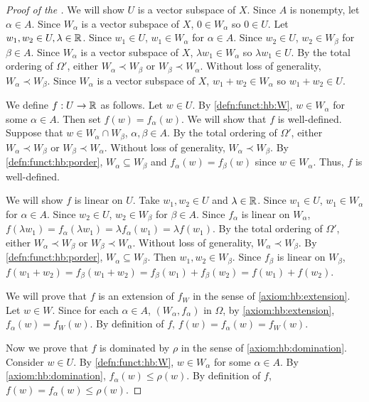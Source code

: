 \begin{proof}[Proof of the ]
We will show $U$ is a vector subspace of $X$. Since $A$ is nonempty, let $\alpha \in A$. Since $W_\alpha$ is a vector subspace of $X$, $0 \in W_\alpha$ so $0 \in U$. Let $w_1, w_2 \in U, \lambda \in {\mathbb R}$.
Since $w_1 \in U$, $w_1 \in W_\alpha$ for $\alpha \in A$.
Since $w_2 \in U$, $w_2 \in W_\beta$ for $\beta \in A$.
Since $W_\alpha$ is a vector subspace of $X$, $\lambda w_1 \in W_\alpha$ so $\lambda w_1 \in U$.
By the total ordering of $\Omega'$, either $W_\alpha \prec W_\beta$ or $W_\beta \prec W_\alpha$.
Without loss of generality, $W_\alpha \prec W_\beta$. Since $W_\alpha$ is a vector subspace of $X$, $w_1 + w_2 \in W_\alpha$ so $w_1 + w_2 \in U$.

We define $f : U \to {\mathbb R}$ as follows. Let $w \in U$. By \ref{defn:funct:hb:W}, $w \in W_\alpha$ for some $\alpha \in A$. Then set $f(w) = f_\alpha(w)$. We will show that $f$ is well-defined. Suppose that $w \in W_\alpha \cap W_\beta$, $\alpha, \beta \in A$. By the total ordering of $\Omega'$, either $W_\alpha \prec W_\beta$ or $W_\beta \prec W_\alpha$. Without loss of generality, $W_\alpha \prec W_\beta$. By \ref{defn:funct:hb:porder}, $W_\alpha \subseteq W_\beta$ and $f_\alpha(w) = f_\beta(w)$ since $w \in W_\alpha$. Thus, $f$ is well-defined.

We will show $f$ is linear on $U$. Take $w_1, w_2 \in U$ and $\lambda \in {\mathbb R}$.
Since $w_1 \in U$, $w_1 \in W_\alpha$ for $\alpha \in A$.
Since $w_2 \in U$, $w_2 \in W_\beta$ for $\beta \in A$.
Since $f_\alpha$ is linear on $W_\alpha$, $f(\lambda w_1) = f_\alpha(\lambda w_1) = \lambda f_\alpha(w_1) = \lambda f(w_1)$. By the total ordering of $\Omega'$, either $W_\alpha \prec W_\beta$ or $W_\beta \prec W_\alpha$. Without loss of generality, $W_\alpha \prec W_\beta$. By \ref{defn:funct:hb:porder}, $W_\alpha \subseteq W_\beta$. Then $w_1, w_2 \in W_\beta$. Since $f_\beta$ is linear on $W_\beta$, $f(w_1 + w_2) = f_\beta (w_1 + w_2) = f_\beta(w_1) + f_\beta(w_2) = f(w_1) + f(w_2)$.

We will prove that $f$ is an extension of $f_W$ in the sense of \ref{axiom:hb:extension}. Let $w \in W$. Since for each $\alpha \in A$, $(W_\alpha, f_\alpha)$ in $\Omega$, by \ref{axiom:hb:extension}, $f_\alpha(w) = f_W(w)$. By definition of $f$, $f(w) = f_\alpha(w) = f_W(w)$.

Now we prove that $f$ is dominated by $\rho$ in the sense of \ref{axiom:hb:domination}.
Consider $w \in U$. By \ref{defn:funct:hb:W}, $w \in W_\alpha$ for some $\alpha \in A$. By \ref{axiom:hb:domination}, $f_\alpha(w)\leq \rho(w)$. By definition of $f$, $f(w) = f_\alpha(w) \leq \rho(w)$.


\end{proof}
